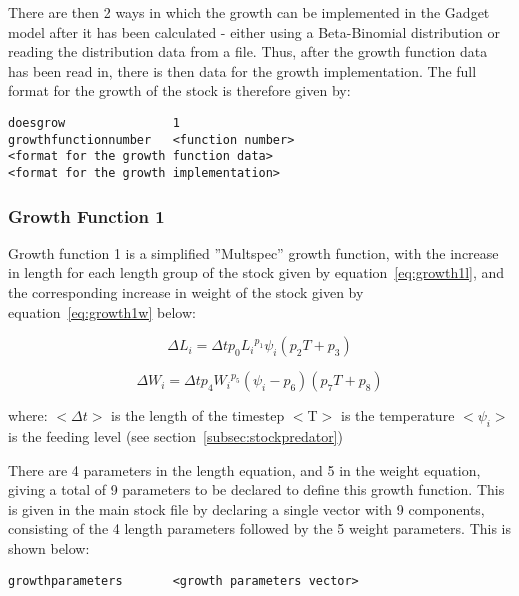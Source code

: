 \documentclass [a4paper, 10pt]{book}
\begin{document}
\bigskip
There are then 2 ways in which the growth can be implemented in the Gadget model after it has been calculated - either using a Beta-Binomial distribution or reading the distribution data from a file.  Thus, after the growth function data has been read in, there is then data for the growth implementation.  The full format for the growth of the stock is therefore given by:

\begin{verbatim}
doesgrow               1
growthfunctionnumber   <function number>
<format for the growth function data>
<format for the growth implementation>
\end{verbatim}

\subsubsection{Growth Function 1}\label{subsec:growth1}
Growth function 1 is a simplified ''Multspec'' growth function, with the increase in length for each length group of the stock given by equation~\ref{eq:growth1l}, and the corresponding increase in weight of the stock given by equation~\ref{eq:growth1w} below:

\begin{equation}\label{eq:growth1l}
\Delta L_i = \Delta t p_0 {L_i}^{p_1} \psi_i (p_2 T + p_3)
\end{equation}

\begin{equation}\label{eq:growth1w}
\Delta W_i = \Delta t p_4 {W_i}^{p_5} (\psi_i - p_6) (p_7 T + p_8)
\end{equation}

where:\newline
$<$$\Delta t$$>$ is the length of the timestep\newline
$<$T$>$ is the temperature\newline
$<$$\psi_i$$>$ is the feeding level (see section~\ref{subsec:stockpredator})

\bigskip
There are 4 parameters in the length equation, and 5 in the weight equation, giving a total of 9 parameters to be declared to define this growth function.  This is given in the main stock file by declaring a single vector with 9 components, consisting of the 4 length parameters followed by the 5 weight parameters.  This is shown below:

\begin{verbatim}
growthparameters       <growth parameters vector>
\end{verbatim}
\end{document}
